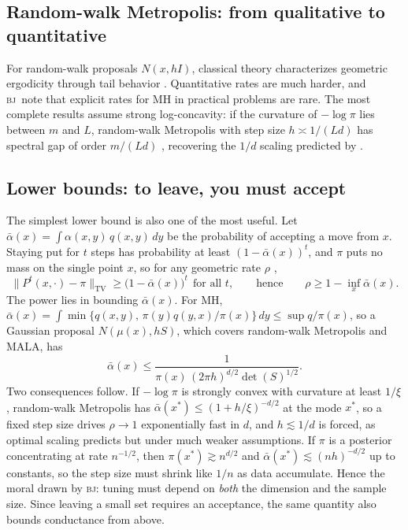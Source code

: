 \documentclass[11pt]{article}
\theoremstyle{remark}
\newcommand{\BJ}{\textsc{bj}}
\newcommand{\TV}{\mathrm{TV}}
\begin{document}
\subsection{Random-walk Metropolis: from qualitative to quantitative}
For random-walk proposals $N(x,hI)$, classical theory characterizes geometric ergodicity through tail behavior \citep{mengersen1996,roberts1996geometric,jarner2000}. Quantitative rates are much harder, and \BJ\ note that explicit rates for MH in practical problems are rare. The most complete results assume strong log-concavity: if the curvature of $-\log\pi$ lies between $m$ and $L$, random-walk Metropolis with step size $h\asymp1/(Ld)$ has spectral gap of order $m/(Ld)$ \citep{andrieu2024explicit}, recovering the $1/d$ scaling predicted by \citet{roberts1997weak}.

\subsection{Lower bounds: to leave, you must accept}
The simplest lower bound is also one of the most useful. Let $\bar\alpha(x)=\int\alpha(x,y)\,q(x,y)\,dy$ be the probability of accepting a move from $x$. Staying put for $t$ steps has probability at least $(1-\bar\alpha(x))^t$, and $\pi$ puts no mass on the single point $x$, so for any geometric rate $\rho$ \citep{brown2024lower},
\begin{equation}\label{eq:bjlower}
\|P^t(x,\cdot)-\pi\|_\TV\ge\bigl(1-\bar\alpha(x)\bigr)^t\ \ \text{for all }t,\qquad\text{hence}\qquad\rho\ge1-\inf_x\bar\alpha(x).
\end{equation}
The power lies in bounding $\bar\alpha(x)$. For MH, $\bar\alpha(x)=\int\min\{q(x,y),\,\pi(y)q(y,x)/\pi(x)\}\,dy\le\sup q/\pi(x)$, so a Gaussian proposal $N(\mu(x),hS)$, which covers random-walk Metropolis and MALA, has
\[
\bar\alpha(x)\le\frac{1}{\pi(x)\,(2\pi h)^{d/2}\det(S)^{1/2}}.
\]
Two consequences follow. If $-\log\pi$ is strongly convex with curvature at least $1/\xi$, random-walk Metropolis has $\bar\alpha(x^*)\le(1+h/\xi)^{-d/2}$ at the mode $x^*$, so a fixed step size drives $\rho\to1$ exponentially fast in $d$, and $h\lesssim1/d$ is forced, as optimal scaling predicts but under much weaker assumptions. If $\pi$ is a posterior concentrating at rate $n^{-1/2}$, then $\pi(x^*)\gtrsim n^{d/2}$ and $\bar\alpha(x^*)\lesssim(nh)^{-d/2}$ up to constants, so the step size must shrink like $1/n$ as data accumulate. Hence the moral drawn by \BJ: tuning must depend on \emph{both} the dimension and the sample size. Since leaving a small set requires an acceptance, the same quantity also bounds conductance from above.
\end{document}
